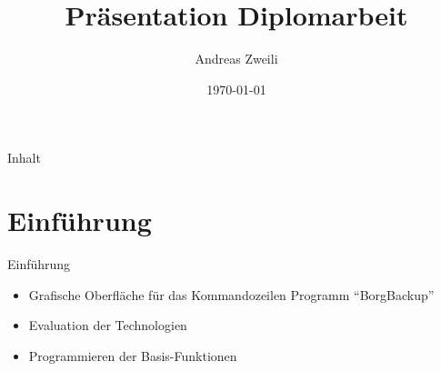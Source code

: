 \documentclass[12pt, aspectratio=1610]{beamer}
\author{Andreas Zweili}
\date{\today}
\title{Präsentation Diplomarbeit}
\begin{document}
\maketitle\newpage
\begin{frame}{Inhalt}
\tableofcontents
\end{frame}


\section{Einführung}
\label{sec:orge023b06}
\begin{frame}[label={sec:org9f49b5e}]{Einführung}
\begin{itemize}
\item <2-> Grafische Oberfläche für das \newline Kommandozeilen Programm "`BorgBackup"'
\item <3-> Evaluation der Technologien
\item <4-> Programmieren der Basis-Funktionen
\end{itemize}
\end{frame}
\end{document}
